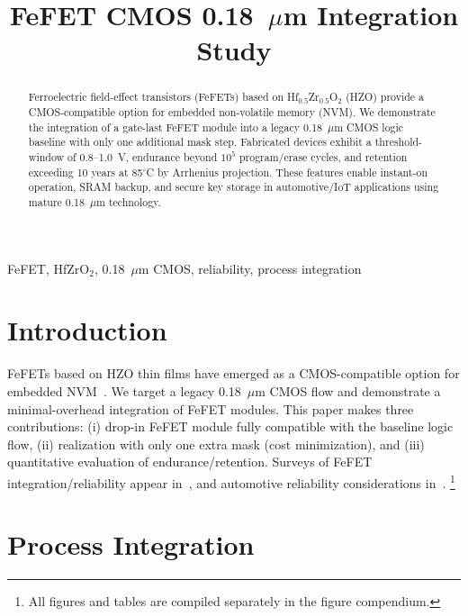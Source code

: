 \documentclass[conference]{IEEEtran}
\begin{document}
\title{FeFET CMOS 0.18~$\mu$m Integration Study}

\author{
}

\maketitle

\begin{abstract}
Ferroelectric field-effect transistors (FeFETs) based on Hf$_{0.5}$Zr$_{0.5}$O$_2$ (HZO) provide a CMOS-compatible option for embedded non-volatile memory (NVM). We demonstrate the integration of a gate-last FeFET module into a legacy 0.18~$\mu$m CMOS logic baseline with only one additional mask step. Fabricated devices exhibit a threshold-window of 0.8--1.0~V, endurance beyond $10^5$ program/erase cycles, and retention exceeding 10 years at 85$^\circ$C by Arrhenius projection. These features enable instant-on operation, SRAM backup, and secure key storage in automotive/IoT applications using mature 0.18~$\mu$m technology.
\end{abstract}

\begin{IEEEkeywords}
FeFET, HfZrO$_2$, 0.18~$\mu$m CMOS, reliability, process integration
\end{IEEEkeywords}

\section{Introduction}
FeFETs based on HZO thin films have emerged as a CMOS-compatible option for embedded NVM~\cite{Boscke2011,Mueller2012,Schenk2019}. We target a legacy 0.18~$\mu$m CMOS flow and demonstrate a minimal-overhead integration of FeFET modules. This paper makes three contributions: (i) drop-in FeFET module fully compatible with the baseline logic flow, (ii) realization with only one extra mask (cost minimization), and (iii) quantitative evaluation of endurance/retention. Surveys of FeFET integration/reliability appear in~\cite{Mueller2015,Park2020}, and automotive reliability considerations in~\cite{Nakamura2003}.%
\footnote{All figures and tables are compiled separately in the figure compendium.}

\section{Process Integration}
\end{document}
